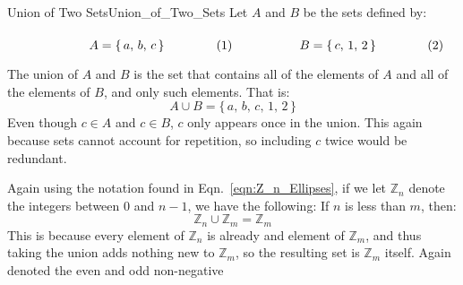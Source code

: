         \begin{lexample}{Union of Two Sets}{Union_of_Two_Sets}
            Let $A$ and $B$ be the sets defined by:
            \par\hfill\par
            \begin{subequations}
                \begin{minipage}[b]{0.49\textwidth}
                    \begin{equation}
                        A=\{\,a,\,b,\,c\,\}
                    \end{equation}
                \end{minipage}
                \hfill
                \begin{minipage}[b]{0.49\textwidth}
                    \begin{equation}
                        B=\{\,c,\,1,\,2\,\}
                    \end{equation}
                \end{minipage}
            \end{subequations}
            \par\vspace{2.5ex}
            The union of $A$ and $B$ is the set that contains all of the
            elements of $A$ and all of the elements of $B$, and only such
            elements. That is:
            \begin{equation}
                A\cup{B}=\{\,a,\,b,\,c,\,1,\,2\,\}
            \end{equation}
            Even though $c\in{A}$ and $c\in{B}$, $c$ only appears once in the
            union. This again because sets cannot account for repetition, so
            including $c$ twice would be redundant.
            \par\hfill\par
            Again using the notation found in Eqn.~\ref{eqn:Z_n_Ellipses},
            if we let $\mathbb{Z}_{n}$ denote the integers between $0$ and
            $n-1$, we have the following: If $n$ is less than $m$, then:
            \begin{equation}
                \mathbb{Z}_{n}\cup\mathbb{Z}_{m}=\mathbb{Z}_{m}
            \end{equation}
            This is because every element of $\mathbb{Z}_{n}$ is already
            and element of $\mathbb{Z}_{m}$, and thus taking the union adds
            nothing new to $\mathbb{Z}_{m}$, so the resulting set is
            $\mathbb{Z}_{m}$ itself. Again denoted the even and odd non-negative

\end{lexample}
